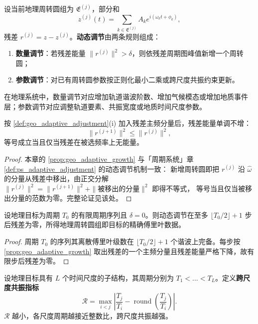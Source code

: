 \begin{definition}[地理周转圆组的动态调节]\label{def:geo_adaptive_adjustment}
设当前地理周转圆组为 $\mathfrak E^{(j)}$，部分和
\[
z^{(j)}(t)=\sum_{k\in\mathfrak E^{(j)}}A_k e^{i(\omega_k t+\phi_k)},
\]
残差 $r^{(j)}=z-z^{(j)}$。\textbf{动态调节}由两条规则组成：
\begin{enumerate}[label=(\roman*)]
    \item \textbf{数量调节}：若残差能量 $\|r^{(j)}\|^2>\delta$，则依残差周期图峰值新增一个周转圆；
    \item \textbf{参数调节}：对已有周转圆参数按正则化最小二乘或跨尺度共振约束更新。
\end{enumerate}
在地理系统中，数量调节对应增加轨道谐波阶数、增加气候模态或增加地质事件层；参数调节对应调整轨道要素、共振宽度或地质时间尺度参数。
\end{definition}

\begin{proposition}[数量调节的单调性]\label{prop:geo_adaptive_growth}
按 \cref{def:geo_adaptive_adjustment}(i) 加入残差主频分量后，残差能量单调不增：
\[
\|r^{(j+1)}\|^2\le\|r^{(j)}\|^2,
\]
等号成立当且仅当残差在被选频率上无能量。
\end{proposition}

\begin{proof}
本章的 \cref{prop:geo_adaptive_growth} 与「周期系统」章 \cref{def:ps_adaptive_adjustment} 的动态调节机制一致：
新增周转圆即把 $r^{(j)}$ 沿 $\hat\omega$ 的分量从残差中移出，由正交分解
$\|r^{(j)}\|^2=\|r^{(j+1)}\|^2+\|\text{被移出的分量}\|^2$ 即得不等式，
等号当且仅当被移出分量的范数为零。完整论证见该处。
\end{proof}

\begin{theorem}[动态调节的收敛性]\label{thm:geo_adaptive_convergence}
设地理目标为周期 $T_0$ 的有限周期序列且 $\delta=0$。则动态调节在至多 $\lfloor T_0/2\rfloor+1$ 步后残差为零，所得地理周转圆组即目标的精确傅里叶数据。
\end{theorem}

\begin{proof}
周期 $T_0$ 的序列其离散傅里叶级数在 $\lfloor T_0/2\rfloor+1$ 个谐波上完备。每步按 \cref{prop:geo_adaptive_growth} 取出残差的一个主频分量且残差能量严格下降，故有限步后残差为零。
\end{proof}

\begin{definition}[跨尺度共振指标]\label{def:geo_cross_scale_resonance}
设地理目标具有 $L$ 个时间尺度的子结构，其周期分别为 $T_1<\dots<T_L$。定义\textbf{跨尺度共振指标}
\[
\mathcal R=\max_{i<j}\left|\frac{T_j}{T_i}-\operatorname{round}\left(\frac{T_j}{T_i}\right)\right|.
\]
$\mathcal R$ 越小，各尺度周期越接近整数比，跨尺度共振越强。
\end{definition}

